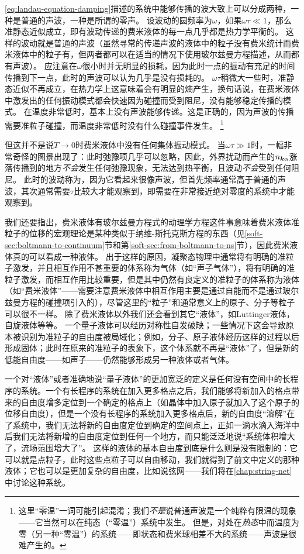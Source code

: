 \eqref{eq:landau-equation-damping}描述的系统中能够传播的波大致上可以分成两种，一种是普通的声波，一种是所谓的零声。
设波动的圆频率为$\omega$，如果$\omega \tau \ll 1$，那么准静态近似成立，即有波动传递的费米液体的每一点几乎都是热力学平衡的。
这样的波动就是普通的声波（虽然寻常的传递声波的液体中的粒子没有费米统计而费米液体中的粒子有，但两者都可以在适当的情况下使用玻尔兹曼方程描述，从而都有声波）。%
应注意在$\omega$很小时并无明显的损耗，因为此时一点的振动有充足的时间传播到下一点，此时的声波可以认为几乎是没有损耗的。
$\omega \tau$稍微大一些时，准静态近似不再成立，在热力学上这意味着会有明显的熵产生，换句话说，在费米液体中激发出的任何振动模式都会快速因为碰撞而受到阻尼，没有能够稳定传播的模式。
在温度非常低时，基本上没有声波能够传递。这是正确的，因为声波的传播需要准粒子碰撞，而温度非常低时没有什么碰撞事件发生。%
\footnote{
    这里“零温”一词可能引起混淆；我们\emph{不是}说普通声波是一个纯粹有限温的现象——它当然可以在纯态（“零温”）系统中发生。
    但是，对处在\emph{热态}中而温度为零（另一种“零温”）的系统——即状态和费米球相差不大的系统——声波是很难产生的。
}%

但这并不是说$T \to 0$时费米液体中没有任何集体振动模式。
当$\omega \tau \gg 1$时，一幅非常奇怪的图景出现了：此时弛豫项几乎可以忽略，因此，外界扰动而产生的$n_{\vb*{k} \alpha}$涨落传播到的地方\emph{不会}发生任何弛豫现象，无法达到热平衡，且波动\emph{不会}受到任何阻尼。
此时的波动称为，因为它看起来很像声波，但首先频率通常高于普通的声波，其次通常需要$\tau$比较大才能观察到，即需要在非常接近绝对零度的系统中才能观察到。

我们还要指出，费米液体有玻尔兹曼方程式的动理学方程这件事意味着费米液体准粒子的位移的宏观理论是某种类似于纳维-斯托克斯方程的东西（见\ref{soft-sec:boltmann-to-continuum}节和第\ref{soft-sec:from-boltmann-to-ns}节），因此费米液体真的可以看成一种液体。
出于这样的原因，凝聚态物理中通常将有明确的准粒子激发，并且相互作用不甚重要的体系称为气体（如“声子气体”），将有明确的准粒子激发，而相互作用比较重要，但是其中仍然有良定义的准粒子的体系称为液体（如“费米液体”——需要注意费米液体中相互作用主要是通过自能而不是通过玻尔兹曼方程的碰撞项引入的），尽管这里的“粒子”和通常意义上的原子、分子等粒子可以很不一样。
除了费米液体以外我们还会看到其它“液体”，如Luttinger液体，自旋液体等等。
一个量子液体可以经历对称性自发破缺；一些情况下这会导致原本被识别为准粒子的自由度被局域化；例如，分子、原子液体经历这样的过程以后形成固体；此时在原来的准粒子的表象下，这个体系就不再是“液体”了，但是新的低能自由度——如声子——仍然能够形成另一种液体或者气体。

一个对“液体”或者准确地说“量子液体”的更加宽泛的定义是任何没有空间中的长程序的系统。一个有长程序的系统在加入更多格点之后，我们能够将新加入的格点带来的自由度增多定位到一个确定的格点上（如晶体中加入原子就加入了这个原子的位移自由度），但是一个没有长程序的系统加入更多格点后，新的自由度“溶解”在了系统中，我们无法将新的自由度定位到确定的空间点上，正如一滴水滴入海洋中后我们无法将新增的自由度定位到任何一个地方，而只能泛泛地说“系统体积增大了，流场范围增大了”。
这样的液体的基本自由度到底是什么则是没有限制的：它可以就是点粒子，此时这些点粒子可以自由移动，我们就得到了前文中定义的那种液体；它也可以是更加复杂的自由度，比如说弦网——我们将在\autoref{chap:string-net}中讨论这种系统。

